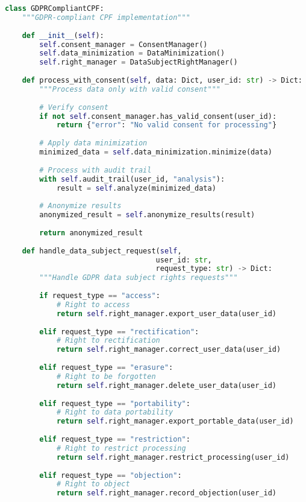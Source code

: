 \documentclass[11pt,a4paper]{article}
\begin{document}
\begin{lstlisting}[language=Python, caption=GDPR Compliance Module]
class GDPRCompliantCPF:
    """GDPR-compliant CPF implementation"""
    
    def __init__(self):
        self.consent_manager = ConsentManager()
        self.data_minimization = DataMinimization()
        self.right_manager = DataSubjectRightManager()
        
    def process_with_consent(self, data: Dict, user_id: str) -> Dict:
        """Process data only with valid consent"""
        
        # Verify consent
        if not self.consent_manager.has_valid_consent(user_id):
            return {"error": "No valid consent for processing"}
        
        # Apply data minimization
        minimized_data = self.data_minimization.minimize(data)
        
        # Process with audit trail
        with self.audit_trail(user_id, "analysis"):
            result = self.analyze(minimized_data)
        
        # Anonymize results
        anonymized_result = self.anonymize_results(result)
        
        return anonymized_result
    
    def handle_data_subject_request(self, 
                                   user_id: str,
                                   request_type: str) -> Dict:
        """Handle GDPR data subject rights requests"""
        
        if request_type == "access":
            # Right to access
            return self.right_manager.export_user_data(user_id)
        
        elif request_type == "rectification":
            # Right to rectification
            return self.right_manager.correct_user_data(user_id)
        
        elif request_type == "erasure":
            # Right to be forgotten
            return self.right_manager.delete_user_data(user_id)
        
        elif request_type == "portability":
            # Right to data portability
            return self.right_manager.export_portable_data(user_id)
        
        elif request_type == "restriction":
            # Right to restrict processing
            return self.right_manager.restrict_processing(user_id)
        
        elif request_type == "objection":
            # Right to object
            return self.right_manager.record_objection(user_id)
\end{lstlisting}
\end{document}
